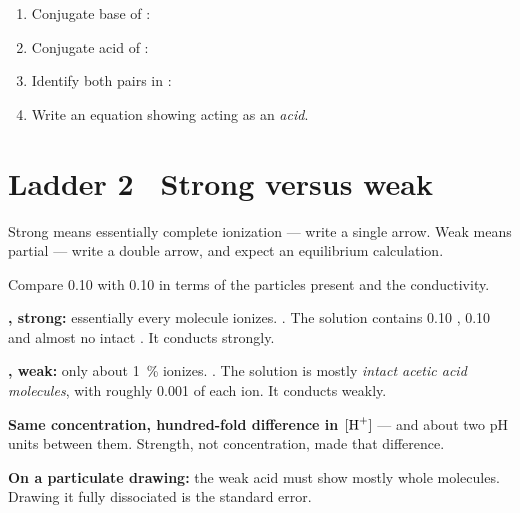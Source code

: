 \documentclass{apchem-worksheet}
\begin{document}
\begin{yourturn}
\begin{enumerate}[leftmargin=*,itemsep=0.5em]
  \item Conjugate base of : \workspace[1.4cm]
  \item Conjugate acid of : \workspace[1.4cm]
  \item Identify both pairs in :
        \workspace[1.8cm]
  \item Write an equation showing  acting as an \emph{acid}.
        \workspace[1.6cm]
\end{enumerate}
\end{yourturn}

\section*{\sffamily Ladder 2 \textbullet\ Strong versus weak}

Strong means essentially complete ionization --- write a single arrow.
Weak means partial --- write a double arrow, and expect an equilibrium
calculation.

\begin{workedexample}
Compare \SI{0.10}{\Molar}  with \SI{0.10}{\Molar}
 in terms of the particles present and the conductivity.

\textbf{, strong:} essentially every molecule ionizes.
. The solution contains \SI{0.10}{\Molar}
, \SI{0.10}{\Molar}  and almost no intact . It
conducts strongly.

\textbf{, weak:} only about \SI{1}{\percent} ionizes.
. The solution is mostly \emph{intact
acetic acid molecules}, with roughly \SI{0.001}{\Molar} of each ion. It
conducts weakly.

\textbf{Same concentration, hundred-fold difference in $[\ce{H+}]$} ---
and about two pH units between them. Strength, not concentration, made
that difference.

\textbf{On a particulate drawing:} the weak acid must show mostly whole
molecules. Drawing it fully dissociated is the standard error.
\end{workedexample}
\end{document}
